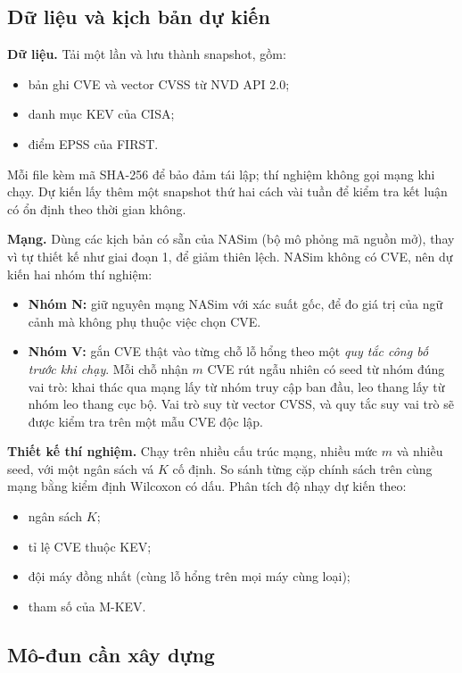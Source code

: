 \documentclass[11pt,a4paper]{article}
\begin{document}
\subsection{Dữ liệu và kịch bản dự kiến}

\textbf{Dữ liệu.} Tải một lần và lưu thành snapshot, gồm:
\begin{itemize}
  \item bản ghi CVE và vector CVSS từ NVD API 2.0;
  \item danh mục KEV của CISA;
  \item điểm EPSS của FIRST.
\end{itemize}
Mỗi file kèm mã SHA-256 để bảo đảm tái lập; thí nghiệm không gọi mạng khi chạy. Dự kiến lấy thêm một snapshot thứ hai cách vài tuần để kiểm tra kết luận có ổn định theo thời gian không.

\textbf{Mạng.} Dùng các kịch bản có sẵn của NASim (bộ mô phỏng mã nguồn mở), thay vì tự thiết kế như giai đoạn 1, để giảm thiên lệch. NASim không có CVE, nên dự kiến hai nhóm thí nghiệm:
\begin{itemize}
  \item \textbf{Nhóm N:} giữ nguyên mạng NASim với xác suất gốc, để đo giá trị của ngữ cảnh mà không phụ thuộc việc chọn CVE.
  \item \textbf{Nhóm V:} gắn CVE thật vào từng chỗ lỗ hổng theo một \emph{quy tắc công bố trước khi chạy}. Mỗi chỗ nhận $m$ CVE rút ngẫu nhiên có seed từ nhóm đúng vai trò: khai thác qua mạng lấy từ nhóm truy cập ban đầu, leo thang lấy từ nhóm leo thang cục bộ. Vai trò suy từ vector CVSS, và quy tắc suy vai trò sẽ được kiểm tra trên một mẫu CVE độc lập.
\end{itemize}

\textbf{Thiết kế thí nghiệm.} Chạy trên nhiều cấu trúc mạng, nhiều mức $m$ và nhiều seed, với một ngân sách vá $K$ cố định. So sánh từng cặp chính sách trên cùng mạng bằng kiểm định Wilcoxon có dấu. Phân tích độ nhạy dự kiến theo:
\begin{itemize}
  \item ngân sách $K$;
  \item tỉ lệ CVE thuộc KEV;
  \item đội máy đồng nhất (cùng lỗ hổng trên mọi máy cùng loại);
  \item tham số của M-KEV.
\end{itemize}

\subsection{Mô-đun cần xây dựng}
\end{document}
